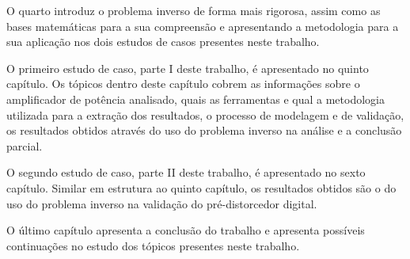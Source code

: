 O quarto introduz o problema inverso de forma mais rigorosa, assim como as bases matemáticas para a sua compreensão e apresentando a metodologia para a sua aplicação nos dois estudos de casos presentes neste trabalho.

O primeiro estudo de caso, parte I deste trabalho, é apresentado no quinto capítulo. Os tópicos dentro deste capítulo cobrem as informações sobre o amplificador de potência analisado, quais as ferramentas e qual a metodologia utilizada para a extração dos resultados, o processo de modelagem e de validação, os resultados obtidos através do uso do problema inverso na análise e a conclusão parcial.

O segundo estudo de caso, parte II deste trabalho, é apresentado no sexto capítulo. Similar em estrutura ao quinto capítulo, os resultados obtidos são o do uso do problema inverso na validação do pré-distorcedor digital.

O último capítulo apresenta a conclusão do trabalho e apresenta possíveis continuações no estudo dos tópicos presentes neste trabalho.
